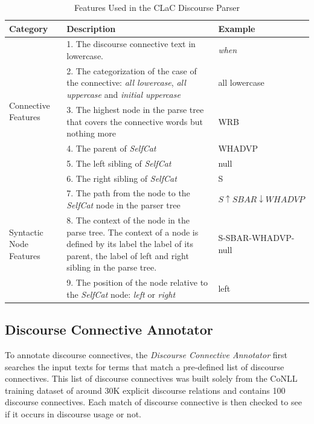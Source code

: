\documentclass[11pt]{article}
\begin{document}
\begin{table}[!htb]
  \centering
  \begin{tabular}{|p{}|p{}|p{}|}
  \hline
  
    \textbf{Category} & \textbf{Description} & \textbf{Example} \\
    \hline
    \hline
    \multirow{6}{*}{\parbox{.15\textwidth}{Connective Features}} 
    & 1. The discourse connective text in lowercase. & \emph{when} \\ \cline{2-3}
    & 2. The categorization of the case of the connective: \textit{all lowercase}, \textit{all uppercase} and \textit{initial uppercase} & all lowercase \\ \cline{2-3}
    & 3. The highest node in the parse tree that covers the connective words but nothing more & WRB \\ \cline{2-3}
    & 4. The parent of \textit{SelfCat} & WHADVP \\ \cline{2-3}
    & 5. The left sibling of \textit{SelfCat} & null \\ \cline{2-3}
    & 6. The right sibling of \textit{SelfCat} & S \\ \hline
 
    \multirow{3}{*}{\parbox{.1\textwidth}{Syntactic Node Features}} 
    & 7. The path from the node to the \textit{SelfCat} node in the parser tree & $S  	\uparrow SBAR  \downarrow WHADVP$ \\ \cline{2-3}
    & 8. The context of the node in the parse tree. The context of a node is defined by its label the label of its parent, the label of left and right sibling in the parse tree. & S-SBAR-WHADVP-null \\ \cline{2-3}
    & 9. The position of the node relative to the \textit{SelfCat} node: \textit{left} or \textit{right} & left \\ \hline
 
  \end{tabular}
  \caption{Features Used in the CLaC Discourse Parser}
  \label{tab:features}
\end{table}
\subsection{Discourse Connective Annotator}

To annotate discourse connectives, the \textit{Discourse Connective Annotator} first searches the input texts for terms that match a pre-defined list of discourse connectives. This list of discourse connectives was built solely from the CoNLL training dataset of around 30K explicit discourse relations and contains 100 discourse connectives. Each match of discourse connective is then checked to see if it occurs in discourse usage or not. 
\end{document}
